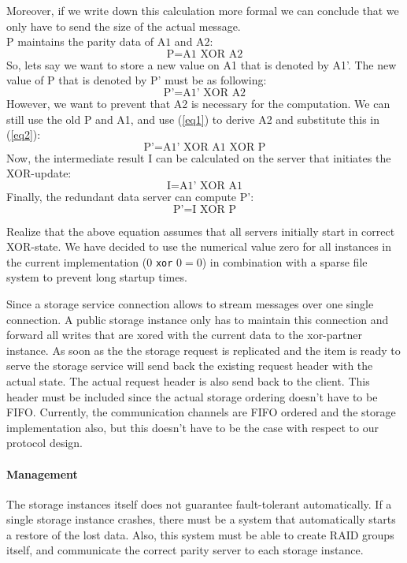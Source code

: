 \documentclass[12pt,a4paper]{scrartcl}
\begin{document}
Moreover, if we write down this calculation more formal we can conclude that we only have to send the size of the actual message. \\ $\text{P}$ maintains the parity data of  $\text{A1}$ and $\text{A2}$:
\begin{equation}\label{eq1}
\text{P} = \text{A1} \text{ XOR } \text{A2}
\end{equation}
So, lets say we want to store a new value on A1 that is denoted by A1’. The new value of P that is denoted by P’ must be as following:
\begin{equation}\label{eq2}
\text{P’} = \text{A1’} \text{ XOR } \text{A2}
\end{equation}
However, we want to prevent that A2 is necessary for the computation. We can still use the old P and A1, and use (\ref{eq1}) to derive A2 and substitute this in (\ref{eq2}):
$$\text{P’} = \text{A1’} \text{ XOR } \text{A1} \text{ XOR } \text{P}$$
Now, the intermediate result I can be calculated on the server that initiates the XOR-update:
$$\text{I} = \text{A1’} \text{ XOR } \text{A1}$$
Finally, the redundant data server can compute P’:
$$\text{P’} = \text{I} \text{ XOR } \text{P}$$

Realize that the above equation assumes that all servers initially start in correct XOR-state. We have decided to use the numerical value zero for all instances in the current implementation ($0$ \verb|xor| $0 = 0$) in combination with a sparse file system to prevent long startup times.

Since a storage service connection allows to stream messages over one single connection. A public storage instance only has to maintain this connection and forward all writes that are xored with the current data to the xor-partner instance. As soon as the the storage request is replicated and the item is ready to serve the storage service will send back the existing request header with the actual state. The actual request header is also send back to the client. This header must be included since the actual storage ordering doesn't have to be FIFO. Currently, the communication channels are FIFO ordered and the storage implementation also, but this doesn't have to be the case with respect to our protocol design.

\paragraph{Management}
The storage instances itself does not guarantee fault-tolerant automatically. If a single storage instance crashes, there must be a system that automatically starts a restore of the lost data. Also, this system must be able to create RAID groups itself, and communicate the correct parity server to each storage instance.
\end{document}
